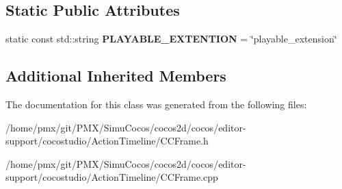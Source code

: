 \subsection*{Static Public Attributes}
\begin{DoxyCompactItemize}
\item 
\mbox{\label{classPlayableFrame_ac768dd3de4b49e695bcb72ca70d124b8}} 
static const std\+::string {\bfseries P\+L\+A\+Y\+A\+B\+L\+E\+\_\+\+E\+X\+T\+E\+N\+T\+I\+ON} = \char`\"{}playable\+\_\+extension\char`\"{}
\end{DoxyCompactItemize}
\subsection*{Additional Inherited Members}


The documentation for this class was generated from the following files\+:\begin{DoxyCompactItemize}
\item 
/home/pmx/git/\+P\+M\+X/\+Simu\+Cocos/cocos2d/cocos/editor-\/support/cocostudio/\+Action\+Timeline/C\+C\+Frame.\+h\item 
/home/pmx/git/\+P\+M\+X/\+Simu\+Cocos/cocos2d/cocos/editor-\/support/cocostudio/\+Action\+Timeline/C\+C\+Frame.\+cpp\end{DoxyCompactItemize}
